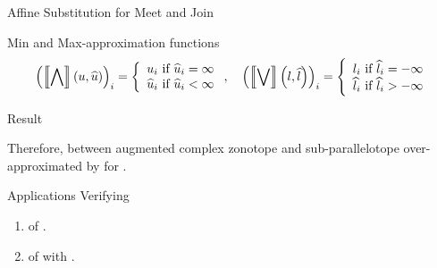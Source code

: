 


\begin{frame}{Affine Substitution for Meet and Join}

{\small
\begin{exampleblock}{Min and Max-approximation functions}
\vspace{-1em}
\begin{align*}
&\left(\left\llbracket\bigwedge\right\rrbracket\left(u,\widehat{u}\right)\right)_i=
\left\{
\begin{array}{l}
u_i~\text{if}~\widehat{u}_i=\infty\\
\widehat{u}_i~\text{if}~\widehat{u}_i<\infty
\end{array}
\right.,\hspace{1em}
\left(\left\llbracket\bigvee\right\rrbracket\left(l,\widehat{l}\right)\right)_i=
\left\{
\begin{array}{l}
l_i~\text{if}~\widehat{l}_i=-\infty\\
\widehat{l}_i~\text{if}~\widehat{l}_i>-\infty
\end{array}
\right.\\
\end{align*}
%
\end{exampleblock}
}
%
\begin{block}{Result}
%
\end{block}
%
\begin{alertblock}{}
{\small Therefore,  between augmented complex zonotope and sub-parallelotope over-approximated by  for .}
\end{alertblock}
\end{frame}



%
\begin{frame}{Applications}
Verifying
\begin{enumerate}
\item {} of .
\item {} of  with .
\end{enumerate}
\end{frame}

